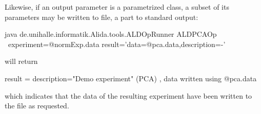 Likewise, if an output parameter is a parametrized class, a subset of
its parameters may be written to file, a part to standard output:
\begin{code}
  java de.unihalle.informatik.Alida.tools.ALDOpRunner ALDPCAOp \
      experiment=@normExp.data result='{data=@pca.data,description=-}'
\end{code}
will return
\begin{code}
  result = { description="Demo experiment" (PCA) , data written using @pca.data }
\end{code}
which indicates that the data of the resulting experiment have been written
to the file \icode{pca.data} as requested.

